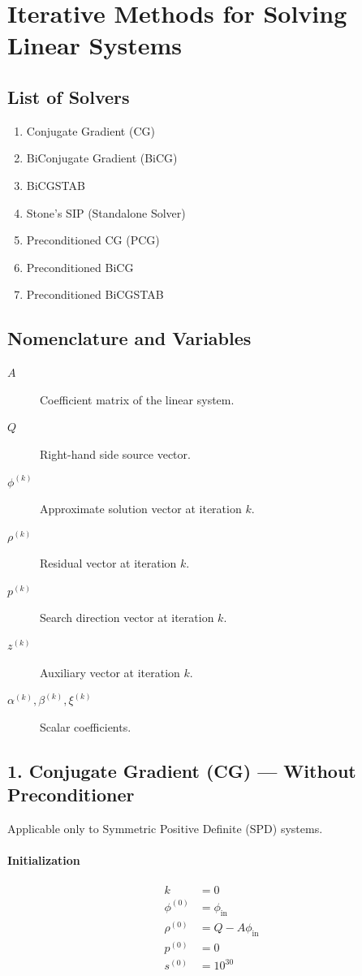 \documentclass[11pt]{article}
\begin{document}
\section{Iterative Methods for Solving Linear Systems}

\subsection{List of Solvers}
\begin{enumerate}
    \item Conjugate Gradient (CG)
    \item BiConjugate Gradient (BiCG)
    \item BiCGSTAB
    \item Stone's SIP (Standalone Solver)
    \item Preconditioned CG (PCG)
    \item Preconditioned BiCG
    \item Preconditioned BiCGSTAB
\end{enumerate}

\subsection{Nomenclature and Variables}

\begin{description}
    \item[$A$] Coefficient matrix of the linear system.
    \item[$Q$] Right-hand side source vector.
    \item[$\phi^{(k)}$] Approximate solution vector at iteration $k$.
    \item[$\rho^{(k)}$] Residual vector at iteration $k$.
    \item[$p^{(k)}$] Search direction vector at iteration $k$.
    \item[$z^{(k)}$] Auxiliary vector at iteration $k$.
    \item[$\alpha^{(k)},\beta^{(k)},\xi^{(k)}$] Scalar coefficients.
\end{description}
\subsection{1. Conjugate Gradient (CG) --- Without Preconditioner}

Applicable only to Symmetric Positive Definite (SPD) systems.

\paragraph{Initialization}
\begin{align*}
k &= 0 \\
\phi^{(0)} &= \phi_{\text{in}} \\
\rho^{(0)} &= Q - A\phi_{\text{in}} \\
p^{(0)} &= 0 \\
s^{(0)} &= 10^{30}
\end{align*}
\end{document}
